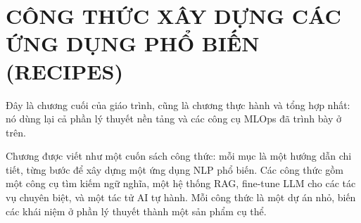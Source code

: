 
\chapter{CÔNG THỨC XÂY DỰNG CÁC ỨNG DỤNG PHỔ BIẾN (RECIPES)}
\label{chap:recipes}

Đây là chương cuối của giáo trình, cũng là chương thực hành và tổng hợp nhất: nó dùng lại cả phần lý thuyết nền tảng và các công cụ MLOps đã trình bày ở trên.

Chương được viết như một cuốn sách công thức: mỗi mục là một hướng dẫn chi tiết, từng bước để xây dựng một ứng dụng NLP phổ biến. Các công thức gồm một công cụ tìm kiếm ngữ nghĩa, một hệ thống RAG, fine-tune LLM cho các tác vụ chuyên biệt, và một tác tử AI tự hành. Mỗi công thức là một dự án nhỏ, biến các khái niệm ở phần lý thuyết thành một sản phẩm cụ thể.
